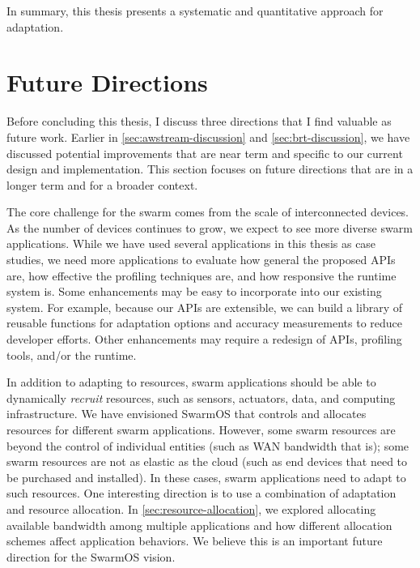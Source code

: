 \documentclass[thesis.tex]{subfiles}
\begin{document}
In summary, this thesis presents a systematic and quantitative approach for
adaptation.

\section{Future Directions}
\label{sec:future-directions}

Before concluding this thesis, I discuss three directions that I find valuable
as future work. Earlier in \autoref{sec:awstream-discussion} and
\autoref{sec:brt-discussion}, we have discussed potential improvements that are
near term and specific to our current design and implementation. This section
focuses on future directions that are in a longer term and for a broader
context.

 The core challenge for the
swarm comes from the scale of interconnected devices. As the number of devices
continues to grow, we expect to see more diverse swarm applications. While we
have used several applications in this thesis as case studies, we need more
applications to evaluate how general the proposed APIs are, how effective the
profiling techniques are, and how responsive the runtime system is. Some
enhancements may be easy to incorporate into our existing system. For example,
because our APIs are extensible, we can build a library of reusable functions
for adaptation options and accuracy measurements to reduce developer
efforts. Other enhancements may require a redesign of APIs, profiling tools,
and/or the runtime.

 In addition to adapting to resources,
swarm applications should be able to dynamically \emph{recruit} resources, such
as sensors, actuators, data, and computing infrastructure. We have envisioned
SwarmOS that controls and allocates resources for different swarm
applications. However, some swarm resources are beyond the control of individual
entities (such as WAN bandwidth that is); some swarm resources are not as
elastic as the cloud (such as end devices that need to be purchased and
installed). In these cases, swarm applications need to adapt to such
resources. One interesting direction is to use a combination of adaptation and
resource allocation. In \autoref{sec:resource-allocation}, we explored
allocating available bandwidth among multiple applications and how different
allocation schemes affect application behaviors. We believe this is an important
future direction for the SwarmOS vision.
\end{document}
